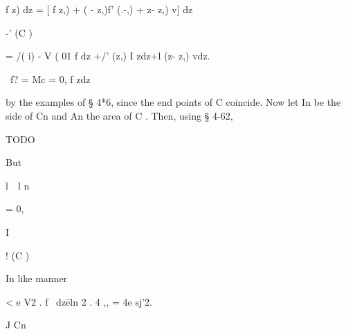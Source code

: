 f z) dz = [  f z,) + (  - z,)f' (.-,) +  z- z,) v] dz 

-' (C ) 

=  /( i) - V ( 01 f dz +/' (z,) I zdz+l (z- z,) vdz. 

\ f?  = Mc  = 0, f zdz 

by the examples of § 4*6, since the end points of C  coincide. 
Now let In be the side of Cn and An the area of C . 
Then, using § 4-62, 

TODO

But 



l\  \ l n 



= 0, 



I  



!  (C ) 



In like manner 



< e   V2 . f \ dz\= eln \/2 . 4 ,, = 4e    sj'2. 

J Cn 

